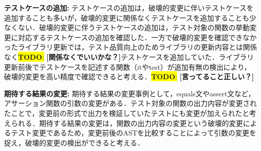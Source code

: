 \documentclass[uplatex,dvipdfmx,a4paper,twocolumn,base=11pt,jbase=11pt,ja=standard]{bxjsarticle}  %
\newcommand{\todo}[1]{\colorbox{yellow}{{\bf TODO}:}{\color{red} {\textbf{[#1]}}}}
\begin{document}

\noindent\textbf{テストケースの追加: }テストケースの追加は，破壊的変更に伴いテストケースを追加することも多いが，破壊的変更に関係なくテストケースを追加することも少なくない．破壊的変更に伴うテストケースの追加は，テスト対象の関数の挙動変更に対応するテストケースの追加を確認した．一方で破壊的変更を確認できなかったライブラリ更新では，テスト品質向上のためライブラリの更新内容とは関係なく\todo{関係なくでいいかな？}テストケースを追加していた．ライブラリ更新前後でテストケースを記述する関数（itやtest）が追加有無の検出により，破壊的変更を高い精度で確認できると考える．\todo{言ってること正しい？}


    
\noindent\textbf{期待する結果の変更: }期待する結果の変更事例として，equals文やassert文など，アサーション関数の引数の変更がある．テスト対象の関数の出力内容が変更されたことで，変更前の形式で出力を検証していたテストにも変更が加えられたと考えられる．期待する結果の変更は，関数の出力内容の変更という破壊的変更によるテスト変更であるため，変更前後のASTを比較することによって引数の変更を捉え，破壊的変更の検出ができると考える．

\end{document}
